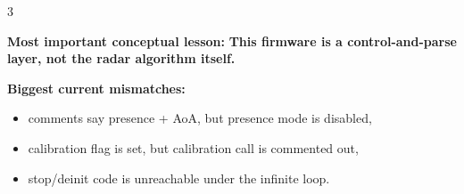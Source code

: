 \documentclass[10pt]{article}
\begin{document}
\begin{multicols*}{3}
\begin{tcolorbox}[summarybox={SR250 Radar Firmware --- Quick Reference}]
\textbf{Most important conceptual lesson:}
\textbf{This firmware is a control-and-parse layer, not the radar algorithm itself.}

\smallskip
\textbf{Biggest current mismatches:}
\begin{itemize}
  \item comments say presence + AoA, but presence mode is disabled,
  \item calibration flag is set, but calibration call is commented out,
  \item stop/deinit code is unreachable under the infinite loop.
\end{itemize}
\end{tcolorbox}

\end{multicols*}
\end{document}
